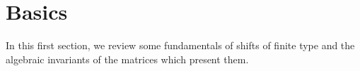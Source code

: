 \documentclass{amsart}
\newtheorem{thm}[equation]{Theorem}
\theoremstyle{definition}
\newtheorem{de}[equation]{Definition}
\newtheorem{ex}[equation]{Example}
\newtheorem{exer}[equation]{Exercise}
\theoremstyle{definition}
\numberwithin{equation}{subsection}
\begin{document}


%
%


\section{Basics}\label{sec:basics}

In this first section, we review some fundamentals of shifts of
finite type and the algebraic invariants of the matrices which
present them.
\end{document}

